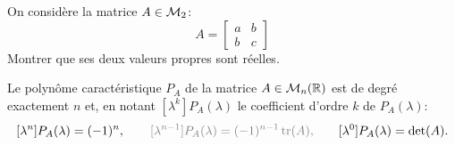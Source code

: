\begin{exercise*}
  On considère la matrice $A \in \mathcal{M}_2$:
  $$
  A = \left[\begin{array}{cc} a & b \\ b & c\end{array}\right]
  $$
  Montrer que ses deux valeurs propres sont réelles.
\end{exercise*}




\begin{theorem}
  Le polynôme caractéristique $P_A$ de la matrice $A \in \mathcal{M}_n(\mathbb{R})$ est de degré exactement $n$ et, en notant $[\lambda^k]P_A(\lambda)$ le coefficient d'ordre $k$ de $P_A(\lambda)$:
  $$
  [\lambda^n]P_A(\lambda) = (-1)^n, \qquad
  \textcolor{gray}{[\lambda^{n-1}]P_A(\lambda) = (-1)^{n-1} \tr(A), \qquad}
  [\lambda^0]P_A(\lambda) = \det(A).
  $$
\end{theorem}

